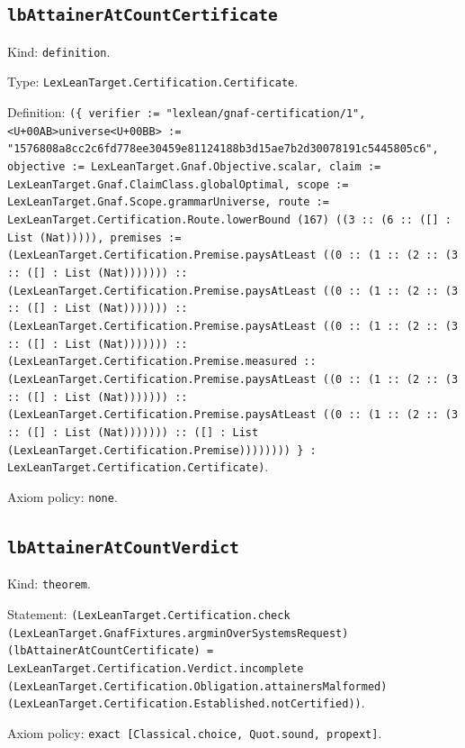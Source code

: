 \documentclass[11pt]{article}
\begin{document}
\subsection*{\texttt{lbAttainerAtCountCertificate}}
\noindent Kind: \texttt{definition}.\par
\noindent Type: \texttt{LexLeanTarget.Certification.Certificate}.\par
\noindent Definition: \texttt{(\{ verifier := "lexlean/gnaf-certification/1", <U+00AB>universe<U+00BB> := "1576808a8cc2c6fd778ee30459e81124188b3d15ae7b2d30078191c5445805c6", objective := LexLeanTarget.Gnaf.Objective.scalar, claim := LexLeanTarget.Gnaf.ClaimClass.globalOptimal, scope := LexLeanTarget.Gnaf.Scope.grammarUniverse, route := LexLeanTarget.Certification.Route.lowerBound (167) ((3 :: (6 :: ([] : List (Nat))))), premises := (LexLeanTarget.Certification.Premise.paysAtLeast ((0 :: (1 :: (2 :: (3 :: ([] : List (Nat))))))) :: (LexLeanTarget.Certification.Premise.paysAtLeast ((0 :: (1 :: (2 :: (3 :: ([] : List (Nat))))))) :: (LexLeanTarget.Certification.Premise.paysAtLeast ((0 :: (1 :: (2 :: (3 :: ([] : List (Nat))))))) :: (LexLeanTarget.Certification.Premise.measured :: (LexLeanTarget.Certification.Premise.paysAtLeast ((0 :: (1 :: (2 :: (3 :: ([] : List (Nat))))))) :: (LexLeanTarget.Certification.Premise.paysAtLeast ((0 :: (1 :: (2 :: (3 :: ([] : List (Nat))))))) :: ([] : List (LexLeanTarget.Certification.Premise)))))))) \} : LexLeanTarget.Certification.Certificate)}.\par
\noindent Axiom policy: \texttt{none}.\par
\subsection*{\texttt{lbAttainerAtCountVerdict}}
\noindent Kind: \texttt{theorem}.\par
\noindent Statement: \texttt{(LexLeanTarget.Certification.check (LexLeanTarget.GnafFixtures.argminOverSystemsRequest) (lbAttainerAtCountCertificate) = LexLeanTarget.Certification.Verdict.incomplete (LexLeanTarget.Certification.Obligation.attainersMalformed) (LexLeanTarget.Certification.Established.notCertified))}.\par
\noindent Axiom policy: \texttt{exact [Classical.choice, Quot.sound, propext]}.\par
\end{document}
